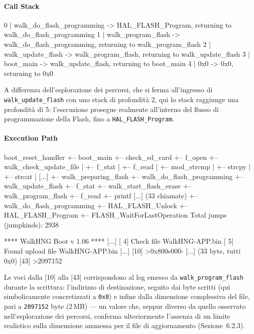 \paragraph{Call Stack}

\begin{bashcode}
0 | walk_do_flash_programming -> HAL_FLASH_Program, returning to walk_do_flash_programming
1 | walk_program_flash -> walk_do_flash_programming, returning to walk_program_flash
2 | walk_update_flash -> walk_program_flash, returning to walk_update_flash
3 | boot_main -> walk_update_flash, returning to boot_main
4 | 0x0 -> 0x0, returning to 0x0
\end{bashcode}
A differenza dell'esplorazione dei percorsi, che si ferma all'ingresso 
di \texttt{walk\_update\_flash} con uno stack di profondità 2, qui lo 
stack raggiunge una profondità di 5: l'esecuzione prosegue realmente 
all'interno del flusso di programmazione della Flash, fino a 
\texttt{HAL\_FLASH\_Program}.

\paragraph{Execution Path}

\begin{bashcode}
boot_reset_handler
+-- boot_main
    +-- check_sd_card
    +-- f_open
    +-- walk_check_update_file
    |   +-- f_stat
    |   +-- f_read
    |   +-- mod_strcmp
    |   +-- strcpy
    |   +-- strcat
    |   [...]
    +-- walk_preparing_flash
    +-- walk_do_flash_programming
    +-- walk_update_flash
        +-- f_stat
        +-- walk_start_flash_erase
        +-- walk_program_flash
            +-- f_read
            +-- printf  [...]  (33 chiamate)
            +-- walk_do_flash_programming
                +-- HAL_FLASH_Unlock
                +-- HAL_FLASH_Program
                    +-- FLASH_WaitForLastOperation
Total jumps (jumpkinds): 2938
\end{bashcode}

\begin{bashcode}
[ 0] **** WalkHNG Boot v 1.06 ****
[...]
[ 4] Check file WalkHNG-APP.bin
[ 5] Found upload file WalkHNG-APP.bin
[...]
[10] >0x800e000-
[...]  (33 byte, tutti 0x0)
[43] >2097152
\end{bashcode}

        Le voci dalla [10] alla [43] corrispondono al log emesso da 
        \texttt{walk\_program\_flash} durante la scrittura: l'indirizzo di 
        destinazione, seguito dai byte scritti (qui simbolicamente concretizzati 
        a \texttt{0x0}) e infine dalla dimensione complessiva del file, pari a 
        \texttt{2097152} byte (2\,MB) — un valore che, seppur diverso da quello 
        osservato nell'esplorazione dei percorsi, conferma ulteriormente 
        l'assenza di un limite realistico sulla dimensione ammessa per il file 
        di aggiornamento (Sezione~6.2.3).


